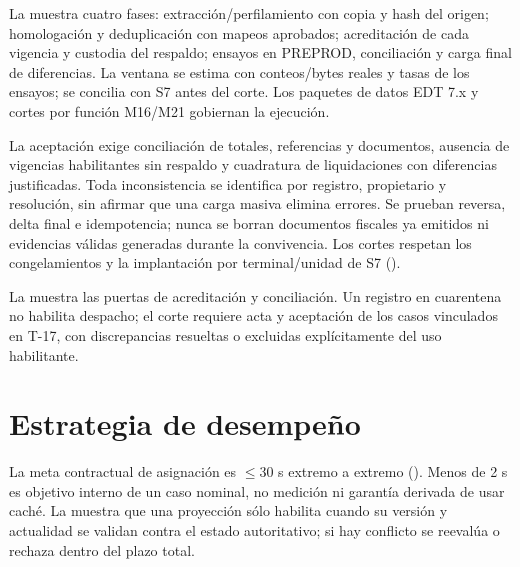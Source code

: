 La  muestra cuatro fases: extracción/perfilamiento con copia y hash del origen; homologación y deduplicación con mapeos aprobados; acreditación de cada vigencia y custodia del respaldo; ensayos en PREPROD, conciliación y carga final de diferencias. La ventana se estima con conteos/bytes reales y tasas de los ensayos; se concilia con S7 antes del corte. Los paquetes de datos EDT 7.x y cortes por función M16/M21 gobiernan la ejecución.

La aceptación exige conciliación de totales, referencias y documentos, ausencia de vigencias habilitantes sin respaldo y cuadratura de liquidaciones con diferencias justificadas. Toda inconsistencia se identifica por registro, propietario y resolución, sin afirmar que una carga masiva elimina errores. Se prueban reversa, delta final e idempotencia; nunca se borran documentos fiscales ya emitidos ni evidencias válidas generadas durante la convivencia. Los cortes respetan los congelamientos y la implantación por terminal/unidad de S7 ().


La  muestra las puertas de acreditación y conciliación. Un registro en cuarentena no habilita despacho; el corte requiere acta y aceptación de los casos vinculados en T-17, con discrepancias resueltas o excluidas explícitamente del uso habilitante.

\section{Estrategia de desempeño}\label{sec:5-desempeno}\label{sec:05-estrategia-de-desempeno}

La meta contractual de asignación es $\leq$30 s extremo a extremo (). Menos de 2 s es objetivo interno de un caso nominal, no medición ni garantía derivada de usar caché. La  muestra que una proyección sólo habilita cuando su versión y actualidad se validan contra el estado autoritativo; si hay conflicto se reevalúa o rechaza dentro del plazo total.


